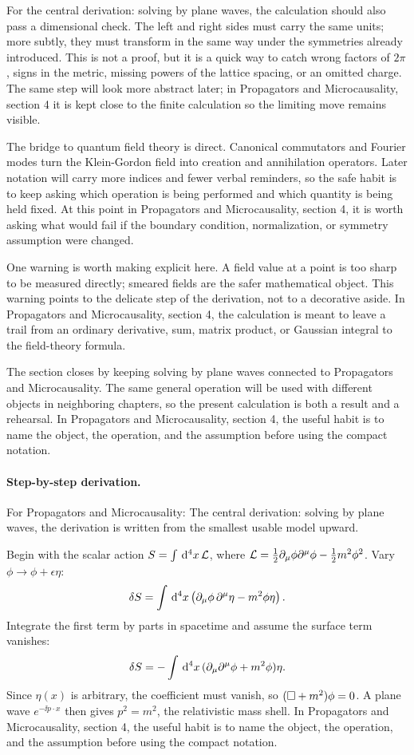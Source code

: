 For the central derivation: solving by plane waves, the calculation should also pass a dimensional check.  The left and right sides must carry the same units; more subtly, they must transform in the same way under the symmetries already introduced.  This is not a proof, but it is a quick way to catch wrong factors of \(2\pi\), signs in the metric, missing powers of the lattice spacing, or an omitted charge.  The same step will look more abstract later; in Propagators and Microcausality, section 4 it is kept close to the finite calculation so the limiting move remains visible.

The bridge to quantum field theory is direct.  Canonical commutators and Fourier modes turn the Klein-Gordon field into creation and annihilation operators.  Later notation will carry more indices and fewer verbal reminders, so the safe habit is to keep asking which operation is being performed and which quantity is being held fixed.  At this point in Propagators and Microcausality, section 4, it is worth asking what would fail if the boundary condition, normalization, or symmetry assumption were changed.

One warning is worth making explicit here.  A field value at a point is too sharp to be measured directly; smeared fields are the safer mathematical object.  This warning points to the delicate step of the derivation, not to a decorative aside.  In Propagators and Microcausality, section 4, the calculation is meant to leave a trail from an ordinary derivative, sum, matrix product, or Gaussian integral to the field-theory formula.

The section closes by keeping solving by plane waves connected to Propagators and Microcausality.  The same general operation will be used with different objects in neighboring chapters, so the present calculation is both a result and a rehearsal.  In Propagators and Microcausality, section 4, the useful habit is to name the object, the operation, and the assumption before using the compact notation.



\paragraph{Step-by-step derivation.}

For Propagators and Microcausality: The central derivation: solving by plane waves, the derivation is written from the smallest usable model upward.

Begin with the scalar action \(S=\int\,\mathrm d^4x\,\mathcal L\), where \(\mathcal L=\frac12\partial_\mu\phi\partial^\mu\phi-\frac12m^2\phi^2\).  Vary \(\phi\to\phi+\epsilon\eta\):
\[
  \delta S=\int\,\mathrm d^4x\left(\partial_\mu\phi\,\partial^\mu\eta-m^2\phi\eta\right).
\]
Integrate the first term by parts in spacetime and assume the surface term vanishes:
\[
  \delta S=-\int\,\mathrm d^4x\,(\partial_\mu\partial^\mu\phi+m^2\phi)\eta.
\]
Since \(\eta(x)\) is arbitrary, the coefficient must vanish, so \((\Box+m^2)\phi=0\).  A plane wave \(e^{-\ii p\cdot x}\) then gives \(p^2=m^2\), the relativistic mass shell.  In Propagators and Microcausality, section 4, the useful habit is to name the object, the operation, and the assumption before using the compact notation.


